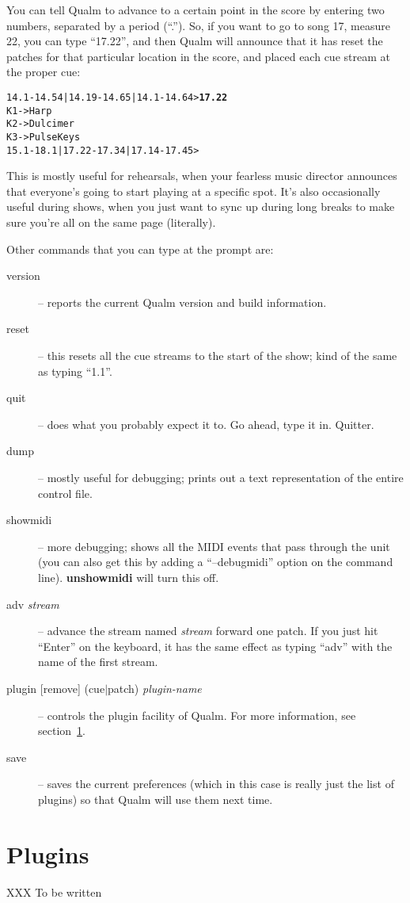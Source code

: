 \documentclass{article}
\newcommand{\q}{{\textsf{Qualm}}\xspace}
\begin{document}
You can tell \q to advance to a certain point in the score by
entering two numbers, separated by a period (``.'').  So, if you want to
go to song 17, measure 22, you can type ``17.22'', and then \q will
announce that it has reset the patches for that particular location in
the score, and placed each cue stream at the proper cue:


\begin{alltt}
    14.1-14.54 | 14.19-14.65 | 14.1-14.64> \textbf{17.22}
    K1 -> Harp
    K2 -> Dulcimer
    K3 -> Pulse Keys
    15.1-18.1 | 17.22-17.34 | 17.14-17.45>
\end{alltt}

This is mostly useful for rehearsals, when your fearless music
director announces that everyone's going to start playing at a specific
spot.  It's also occasionally useful during shows, when you just want
to sync up during long breaks to make sure you're all on the same page
(literally).

Other commands that you can type at the prompt are:

\begin{description}
\item[version] -- reports the current \q version and build
      information.

\item[reset] -- this resets all the cue streams to the start of the
      show; kind of the same as typing ``1.1''.

\item[quit] -- does what you probably expect it to.  Go ahead, type it
      in.  Quitter.

\item[dump] -- mostly useful for debugging; prints out a text
      representation of the entire control file.

\item[showmidi] -- more debugging; shows all the MIDI events that pass
      through the unit (you can also get this by adding a ``--debugmidi''
      option on the command line).  {\bf unshowmidi} will turn this
      off.

\item[adv \textit{stream}] -- advance the stream named {\em stream}
      forward one patch.  If you just hit ``Enter'' on the keyboard,
      it has the same effect as typing ``adv'' with the name of the
      first stream.

\item[plugin {[remove]} (cue$\mid$patch) \textit{plugin-name}] -- controls
      the plugin facility of \q.  For more information, see
      section~\ref{sec:plugins}.

\item[save] -- saves the current preferences (which in this case is
      really just the list of plugins) so that \q will use them next
      time.
\end{description}

\begin{latexonly}\newpage\end{latexonly}
\section{Plugins}
\label{sec:plugins}
XXX To be written
\end{document}
